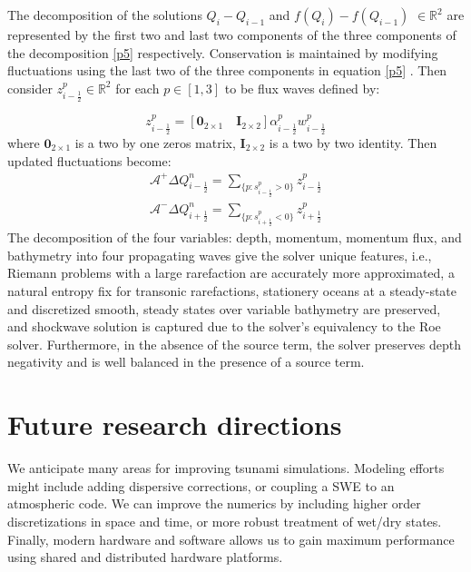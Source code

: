 \documentclass[10pt,a4paper]{article}
\newcommand{\donna}[1]{{\color{red}{#1}}}
\begin{document}
	The decomposition of the solutions $Q_{i} - Q_{i-1} $  and  $f(Q_{i}) - f(Q_{i-1})$ $ \in  \mathbb{R}^{2}$ are represented by the first two and last two components of the three components of the decomposition \eqref{p5} respectively.  Conservation is maintained by modifying fluctuations using the last two of the three components  in equation \eqref{p5} . Then  consider $z_{i-\frac{1}{2}}^{p} \in \mathbb{R}^{2}$ for each $p \in [1,3]$ to be flux waves defined by:
	

	\begin{equation}
		z_{i-\frac{1}{2}}^{p} = [\mathbf{0}_{2\times1} \quad \mathbf{I}_{2\times2}] \alpha_{i-\frac{1}{2}}^{p} w_{i-\frac{1}{2}}^{p}
	\end{equation}
	where $\mathbf{0}_{2\times1}$ is a two by one zeros matrix, $\mathbf{I}_{2\times2}$ is a two by two identity. Then updated fluctuations become:
	\begin{eqnarray}
		\mathcal{A^{+}}\Delta Q_{i-\frac{1}{2}}^{n} = \sum_{\{ p:s_{i-\frac{1}{2}}^{p}>0\}}  z_{i-\frac{1}{2}}^{p}
		\label{p7}\\
		\mathcal{A^{-}}\Delta Q_{i+\frac{1}{2}}^{n} = \sum_{\{ p:s_{i+\frac{1}{2}}^{p}<0\}} z_{i+\frac{1}{2}}^{p}
		\label{p8}
	\end{eqnarray}
The decomposition of the four variables: depth, momentum, momentum flux, and bathymetry into four propagating waves give the solver unique features, i.e.,  Riemann problems with a large rarefaction are accurately more approximated, a natural entropy fix for transonic rarefactions,  stationery oceans at a steady-state and discretized smooth, steady states over variable bathymetry are preserved, and shockwave solution is captured due to the solver's equivalency to the Roe solver.
Furthermore, in the absence of the source term, the solver preserves depth negativity and is well balanced in the presence of a source term.  

\newpage
	\section{ Future research directions}

We anticipate many areas for improving tsunami simulations.  Modeling efforts might include adding dispersive corrections, or coupling a SWE to an atmospheric code.  We can improve the numerics by including higher order discretizations in space and time, or more robust treatment of  wet/dry states.  Finally, modern hardware and software allows us to gain maximum performance using shared and distributed hardware  platforms. 
\end{document}

